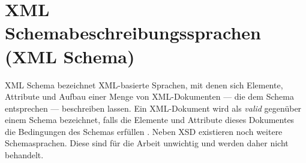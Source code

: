 \section{XML Schemabeschreibungssprachen (XML Schema)}
\label{sec:xmlschema}

\gls{XML} Schema bezeichnet \gls{XML}-basierte Sprachen, mit denen sich Elemente, Attribute und Aufbau einer Menge von \gls{XML}-Dokumenten --- die dem Schema entsprechen --- beschreiben lassen. 
Ein \gls{XML}-Dokument wird als \emph{valid} gegenüber einem Schema bezeichnet, falls die Elemente und Attribute dieses Dokumentes die Bedingungen des Schemas erfüllen \cite{taxonomyXMLSchema}.
Neben \gls{XSD} existieren noch weitere Schemasprachen. Diese sind für die Arbeit unwichtig und werden daher nicht behandelt. 



%